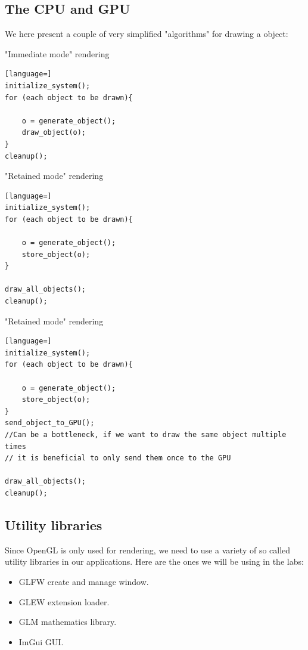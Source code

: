 \subsection*{The CPU and GPU}
We here present a couple of very simplified "algorithms" for drawing a object:

\begin{example}{"Immediate mode" rendering} 
\begin{lstlisting}[language=]
initialize_system();
for (each object to be drawn){
	
	o = generate_object();
	draw_object(o);
}
cleanup();
\end{lstlisting}
\end{example}	

\begin{example}{"Retained mode" rendering} 
\begin{lstlisting}[language=]
initialize_system();
for (each object to be drawn){
	
	o = generate_object();
	store_object(o);
}

draw_all_objects();
cleanup();
\end{lstlisting}
\end{example}	

\begin{example}{"Retained mode" rendering} 
\begin{lstlisting}[language=]
initialize_system();
for (each object to be drawn){
	
	o = generate_object();
	store_object(o);
}
send_object_to_GPU(); 
//Can be a bottleneck, if we want to draw the same object multiple times
// it is beneficial to only send them once to the GPU

draw_all_objects();
cleanup();
\end{lstlisting}
\end{example}	

\subsection*{Utility libraries}
Since OpenGL is only used for rendering, we need to use a variety of so called utility libraries in our applications. Here are the ones we will be using in the labs:

\begin{itemize}
	\item GLFW create and manage window.
	\item GLEW extension loader.
	\item GLM mathematics library.
	\item ImGui GUI.
\end{itemize}


